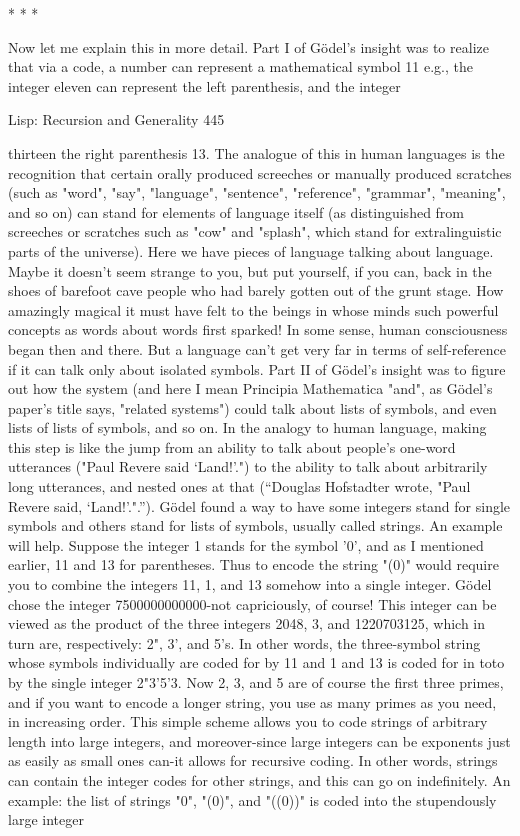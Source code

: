                                             *   *   *

        Now let me explain this in more detail. Part I of Gödel’s insight was to realize
that via a code, a number can represent a mathematical symbol 11 e.g., the integer
eleven can represent the left parenthesis, and the integer




Lisp: Recursion and Generality                                                        445

thirteen the right parenthesis 13. The analogue of this in human languages is the
recognition that certain orally produced screeches or manually produced scratches
(such as "word", "say", "language", "sentence", "reference", "grammar", "meaning",
and so on) can stand for elements of language itself (as distinguished from screeches
or scratches such as "cow" and "splash", which stand for extralinguistic parts of the
universe). Here we have pieces of language talking about language. Maybe it doesn't
seem strange to you, but put yourself, if you can, back in the shoes of barefoot cave
people who had barely gotten out of the grunt stage. How amazingly magical it must
have felt to the beings in whose minds such powerful concepts as words about words
first sparked! In some sense, human consciousness began then and there.
        But a language can't get very far in terms of self-reference if it can talk only
about isolated symbols. Part II of Gödel’s insight was to figure out how the system
(and here I mean Principia Mathematica "and", as Gödel’s paper's title says, "related
systems") could talk about lists of symbols, and even lists of lists of symbols, and so
on. In the analogy to human language, making this step is like the jump from an
ability to talk about people's one-word utterances ("Paul Revere said `Land!'.") to the
ability to talk about arbitrarily long utterances, and nested ones at that ("`Douglas
Hofstadter wrote, "Paul Revere said, `Land!'."."').
        Gödel found a way to have some integers stand for single symbols and others
stand for lists of symbols, usually called strings. An example will help. Suppose the
integer 1 stands for the symbol '0', and as I mentioned earlier, 11 and 13 for
parentheses. Thus to encode the string "(0)" would require you to combine the
integers 11, 1, and 13 somehow into a single integer. Gödel chose the integer
7500000000000-not capriciously, of course! This integer can be viewed as the
product of the three integers 2048, 3, and 1220703125, which in turn are,
respectively: 2", 3', and 5's. In other words, the three-symbol string whose symbols
individually are coded for by 11 and 1 and 13 is coded for in toto by the single integer
2"3'5'3. Now 2, 3, and 5 are of course the first three primes, and if you want to encode
a longer string, you use as many primes as you need, in increasing order. This simple
scheme allows you to code strings of arbitrary length into large integers, and
moreover-since large integers can be exponents just as easily as small ones can-it
allows for recursive coding. In other words, strings can contain the integer codes for
other strings, and this can go on indefinitely. An example: the list of strings "0", "(0)",
and "((0))" is coded into the stupendously large integer


